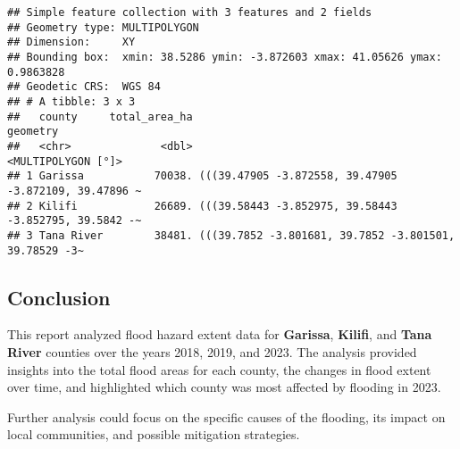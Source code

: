 \documentclass[
]{article}
\begin{document}
\begin{verbatim}
## Simple feature collection with 3 features and 2 fields
## Geometry type: MULTIPOLYGON
## Dimension:     XY
## Bounding box:  xmin: 38.5286 ymin: -3.872603 xmax: 41.05626 ymax: 0.9863828
## Geodetic CRS:  WGS 84
## # A tibble: 3 x 3
##   county     total_area_ha                                              geometry
##   <chr>              <dbl>                                    <MULTIPOLYGON [°]>
## 1 Garissa           70038. (((39.47905 -3.872558, 39.47905 -3.872109, 39.47896 ~
## 2 Kilifi            26689. (((39.58443 -3.852975, 39.58443 -3.852795, 39.5842 -~
## 3 Tana River        38481. (((39.7852 -3.801681, 39.7852 -3.801501, 39.78529 -3~
\end{verbatim}

\hypertarget{conclusion}{%
\subsection{Conclusion}\label{conclusion}}

This report analyzed flood hazard extent data for \textbf{Garissa},
\textbf{Kilifi}, and \textbf{Tana River} counties over the years 2018,
2019, and 2023. The analysis provided insights into the total flood
areas for each county, the changes in flood extent over time, and
highlighted which county was most affected by flooding in 2023.

Further analysis could focus on the specific causes of the flooding, its
impact on local communities, and possible mitigation strategies.
\end{document}
